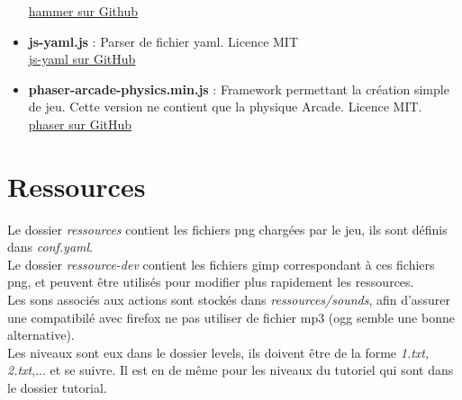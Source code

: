 \documentclass[11pt]{article}
\begin{document}
\begin{itemize}
		\href{https://github.com/EightMedia/hammer.js}
		{hammer sur Github}\\
	\item
		\textbf{js-yaml.js} : Parser de fichier yaml. Licence MIT\\
		\href{https://github.com/nodeca/js-yaml}{js-yaml sur GitHub}\\
	\item
		\textbf{phaser-arcade-physics.min.js} : Framework permettant
		la création simple de jeu. Cette version ne contient que la 
		physique Arcade. Licence MIT.\\
		\href{https://github.com/photonstorm/phaser}
		{phaser sur GitHub}\\
\end{itemize}
\section {Ressources}
Le dossier {\em ressources} contient les fichiers png chargées par le jeu,
ils sont définis dans {\em conf.yaml}.\\
Le dossier {\em ressource-dev} contient les fichiers gimp correspondant à
ces fichiers png, et peuvent être utilisés pour modifier plus rapidement 
les ressources.\\
Les sons associés aux actions sont stockés dans {\em ressources/sounds}, afin 
d'assurer une compatibilé avec firefox ne pas utiliser de fichier mp3 (ogg
semble une bonne alternative).\\
Les niveaux sont eux dans le dossier levels, ils doivent être de la forme 
{\em 1.txt, 2.txt},... et se suivre. Il est en de même pour les niveaux du 
tutoriel qui sont dans le dossier tutorial.\\
\end{document}
